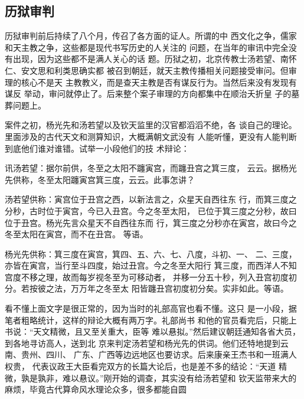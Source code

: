 \subsection{历狱审判}
\par
历狱审判前后持续了八个月，传召了各方面的证人。所谓的中%
西文化之争，儒家和天主教之争，这些都是现代书写历史的人关注的%
问题，在当年的审讯中完全没有出现，因为这些都不是满人关心的话%
题。历狱之初，北京传教士汤若望、南怀仁、安文思和利类思确实都%
被召到朝廷，就天主教传播相关问题接受审问。但审理的核心不是天%
主教教义，而是查天主教是否有谋反行为。当然后来没有发现有谋反%
举动，审问就停止了。后来整个案子审理的方向都集中在顺治夭折皇%
子的墓葬问题上。%
\par
案件之初，杨光先和汤若望以及钦天监里的汉官都滔滔不绝，各%
谈自己的理论。里面涉及的古代天文和测算知识，大概满朝文武没有%
人能听懂，更没有人能判断到底他们谁对谁错。试举一小段他们的技%
术辩论：%
\par
{\bookkai 讯汤若望：据尔前供，冬至之太阳不躔寅宫，而躔丑宫之箕三度，}%
{\bookkai 云云。据杨光先供称，冬至太阳躔寅宫箕三度，云云。此事怎讲？}%
\par
{\bookkai 汤若望供称：寅宫位于丑宫之西，以新法言之，众星天自西往东}%
{\bookkai 行，而箕三度之分秒，古时位于寅宫，今已入丑宫。今之冬至太阳，}%
{\bookkai 已位于箕三度之分秒，故曰位于丑宫。杨光先言众星天不自西往东而}%
{\bookkai 行，箕三度之分秒亦在寅宫，故曰今之冬至太阳在寅宫，而不在丑宫。}%
{\bookkai 等语。}%
\par
{\bookkai 杨光先供称：箕三度在寅宫，箕四、五、六、七、八度，斗初、一、}%
{\bookkai 二、三度，亦皆在寅宫，当行至斗四度，始过丑宫。今之冬至大阳行}%
{\bookkai 箕三度，而西洋人不知宫度不移之理，故而每岁视冬至为可移动者，}%
{\bookkai 并移一分五十秒，列入丑宫初度初分。若按彼之法，万万年之冬至太}%
{\bookkai 阳皆躔丑宫初度初分矣。实非如此。等语。}%
\par
看不懂上面文字是很正常的，因为当时的礼部高官也看不懂。这只%
是一小段，据笔者粗略统计，这样的辩论大概有两万字。礼部尚书%
和他的官员看完后，只能上书说：“天文精微，且又至关重大，臣等%
难以悬拟。”然后建议朝廷通知各省大员，到各地寻访高人，送到北%
京来判定汤若望和杨光先的供词。他们还特地提到云南、贵州、四川、%
广东、广西等边远地区也要访求。后来康亲王杰书和一班满人权贵，%
代表议政王大臣看完双方的长篇大论后，也是差不多的结论：“天道%
精微，孰是孰非，难以悬议。”刚开始的调查，其实没有给汤若望和%
钦天监带来大的麻烦，毕竟古代算命风水理论众多，很多都能自圆%
